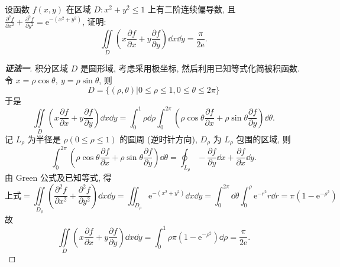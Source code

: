 \begin{example}
    设函数 $f(x,y)$ 在区域 $D:x^2+y^2\leqslant  1$ 上有二阶连续偏导数,
    且 $\displaystyle\frac{\partial^2f}{\partial x^2}+\frac{\partial^2f}{\partial y^2}=\mathrm{e}^{-\left(x^2+y^2\right)}$, 证明:
    $$\iint\limits_D\left(x\frac{\partial f}{\partial x}+y\frac{\partial f}{\partial y}\right)\dd x\dd y=\frac{\pi}{2\mathrm{e}}.$$
\end{example}
\begin{proof}[{\songti \textbf{证法一}}]
    积分区域 $D$ 是圆形域, 考虑采用极坐标, 然后利用已知等式化简被积函数.
    令 $x=\rho\cos\theta,~y=\rho\sin\theta$, 则$$D=\{(\rho,\theta)|0\leqslant \rho\le1,0\leqslant \theta\le2\pi\}$$ 于是
    $$\iint\limits_D\left(x\frac{\partial f}{\partial x}+y\frac{\partial f}{\partial y}\right)\dd x\dd y=\int_0^1\rho\dd \rho\int_0^{2\pi}\left(\rho\cos\theta\frac{\partial f}{\partial x}+\rho\sin\theta\frac{\partial f}{\partial y}\right)\dd \theta.$$
    记 $L_\rho$ 为半径是 $\rho\left(0\leqslant \rho\leqslant  1\right)$ 的圆周 (逆时针方向), $D_\rho$ 为 $L_\rho$ 包围的区域, 则
    $$\int_0^{2\pi}\left(\rho\cos\theta\frac{\partial f}{\partial x}+\rho\sin\theta\frac{\partial f}{\partial y}\right)\dd \theta=\oint_{L_\rho}-\frac{\partial f}{\partial y}\dd x+\frac{\partial f}{\partial x}\dd y.$$
    由 Green 公式及已知等式, 得
    $$\text{上式}=\iint\limits_{D_\rho}\left(\frac{\partial^2f}{\partial x^2}+\frac{\partial ^2f}{\partial y^2}\right)\dd x\dd y=\iint_{D_\rho}\mathrm{e}^{-\left(x^2+y^2\right)}\dd x\dd y=\int_0^{2\pi}\dd \theta\int_0^\rho\mathrm{e}^{-r^2}r\dd r=\pi\left(1-\mathrm{e}^{-\rho^2}\right)$$
    故 $$\iint\limits_D\left(x\frac{\partial f}{\partial x}+y\frac{\partial f}{\partial y}\right)\dd x\dd y=\int_0^1\rho\pi\left(1-\mathrm{e}^{-\rho^2}\right)\dd \rho=\frac{\pi}{2\mathrm{e}}.$$
\end{proof}
